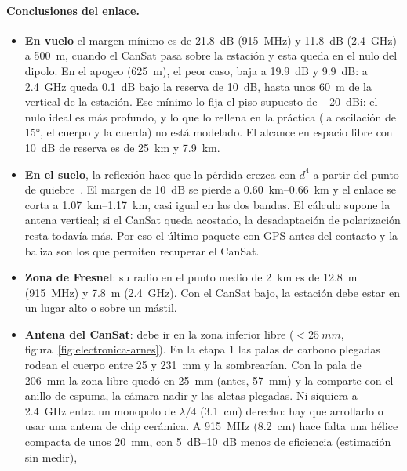 \paragraph{Conclusiones del enlace.}
\begin{itemize}
  \item \textbf{En vuelo} el margen mínimo es de \SI{21.8}{dB} (\SI{915}{MHz}) y
        \SI{11.8}{dB} (\SI{2.4}{GHz}) a \SI{500}{m}, cuando el CanSat pasa sobre la estación y
        esta queda en el nulo del dipolo. En el apogeo (\SI{625}{m}), el peor caso, baja a
        \SI{19.9}{dB} y \SI{9.9}{dB}: a \SI{2.4}{GHz} queda \SI{0.1}{dB} bajo la reserva de
        \SI{10}{dB}, hasta unos \SI{60}{m} de la vertical de la estación. Ese mínimo lo fija
        el piso supuesto de \SI{-20}{dBi}: el nulo ideal es más profundo, y lo que lo rellena
        en la práctica (la oscilación de \ang{15}, el cuerpo y la cuerda) no está modelado. El
        alcance en espacio libre con \SI{10}{dB} de reserva es de \SI{25}{km} y \SI{7.9}{km}.
  \item \textbf{En el suelo}, la reflexión hace que la pérdida crezca con $d^4$ a partir del
        punto de quiebre~\cite{electronica-rappaport2002}. El margen de \SI{10}{dB} se pierde a
        \SIrange{0.60}{0.66}{km} y el enlace se corta a \SIrange{1.07}{1.17}{km}, casi igual
        en las dos bandas. El cálculo supone la antena vertical; si el CanSat queda acostado,
        la desadaptación de polarización resta todavía más. Por eso el último paquete con GPS
        antes del contacto y la baliza son los que permiten recuperar el CanSat.
  \item \textbf{Zona de Fresnel}: su radio en el punto medio de \SI{2}{km} es de \SI{12.8}{m}
        (\SI{915}{MHz}) y \SI{7.8}{m} (\SI{2.4}{GHz}). Con el CanSat bajo, la estación debe
        estar en un lugar alto o sobre un mástil.
  \item \textbf{Antena del CanSat}: debe ir en la zona inferior libre ($<\SI{25}{mm}$,
        figura~\ref{fig:electronica-arnes}). En la etapa 1 las palas de carbono plegadas
        rodean el cuerpo entre 25 y \SI{231}{mm} y la sombrearían. Con la pala de \SI{206}{mm} la
        zona libre quedó en \SI{25}{mm} (antes, \SI{57}{mm}) y la comparte con el anillo de
        espuma, la cámara nadir y las aletas plegadas. Ni siquiera a \SI{2.4}{GHz} entra un
        monopolo de $\lambda/4$ (\SI{3.1}{cm}) derecho: hay que arrollarlo o usar una antena de chip
        cerámica. A \SI{915}{MHz} (\SI{8.2}{cm}) hace falta una hélice compacta de unos
        \SI{20}{mm}, con \SIrange{5}{10}{dB} menos de eficiencia (estimación sin medir),

\end{itemize}
